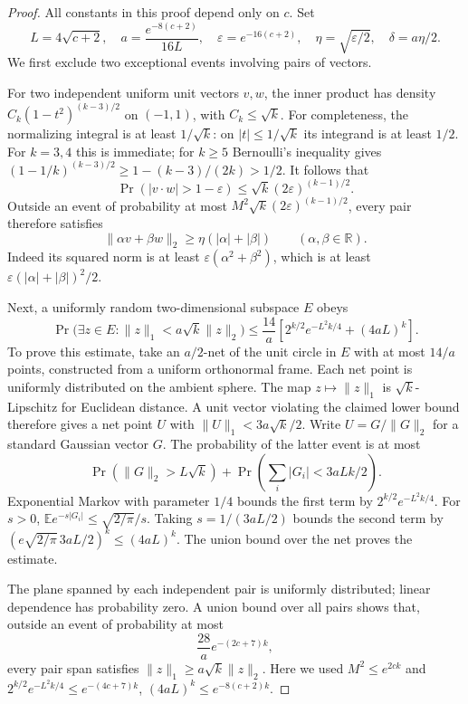 \documentclass[11pt]{article}
\begin{document}
\begin{proof}
All constants in this proof depend only on $c$. Set
\[
 L=4\sqrt{c+2},\quad a=\frac{e^{-8(c+2)}}{16L},\quad
 \varepsilon=e^{-16(c+2)},\quad
 \eta=\sqrt{\varepsilon/2},\quad \delta=a\eta/2.
\]
We first exclude two exceptional events involving pairs of vectors.

For two independent uniform unit vectors $v,w$, the inner product
has density $C_k(1-t^2)^{(k-3)/2}$ on $(-1,1)$, with $C_k\leq\sqrt{k}$.
For completeness, the normalizing integral is at least $1/\sqrt{k}$:
on $|t|\leq1/\sqrt{k}$ its integrand is at least $1/2$.
For $k=3,4$ this is immediate; for $k\geq5$ Bernoulli's inequality
gives $(1-1/k)^{(k-3)/2}\geq1-(k-3)/(2k)>1/2$.
It follows that
\[
 \Pr(|v\cdot w|>1-\varepsilon)
 \leq\sqrt{k}(2\varepsilon)^{(k-1)/2}.
\]
Outside an event of probability at most
$M^2\sqrt{k}(2\varepsilon)^{(k-1)/2}$, every pair therefore satisfies
\[
 \|\alpha v+\beta w\|_2
 \geq\eta(|\alpha|+|\beta|)
 \qquad(\alpha,\beta\in\mathbb R).
\]
Indeed its squared norm is at least
$\varepsilon(\alpha^2+\beta^2)$, which is at least
$\varepsilon(|\alpha|+|\beta|)^2/2$.

Next, a uniformly random two-dimensional subspace $E$ obeys
\[
 \Pr\bigl(\exists z\in E:\|z\|_1<a\sqrt{k}\|z\|_2\bigr)
 \leq \frac{14}{a}
 \left[2^{k/2}e^{-L^2k/4}+(4aL)^k\right].
\]
To prove this estimate, take an $a/2$-net of the unit circle in $E$
with at most $14/a$ points, constructed from a uniform orthonormal
frame. Each net point is uniformly distributed on the ambient sphere.
The map $z\mapsto\|z\|_1$ is $\sqrt{k}$-Lipschitz for Euclidean
distance. A unit vector violating the claimed lower bound therefore
gives a net point $U$ with $\|U\|_1<3a\sqrt{k}/2$.
Write $U=G/\|G\|_2$ for a standard Gaussian vector $G$.
The probability of the latter event is at most
\[
 \Pr(\|G\|_2>L\sqrt{k})+
 \Pr\left(\sum_i|G_i|<3aLk/2\right).
\]
Exponential Markov with parameter $1/4$ bounds the first term by
$2^{k/2}e^{-L^2k/4}$. For $s>0$,
$\mathbb E e^{-s|G_i|}\leq\sqrt{2/\pi}/s$.
Taking $s=1/(3aL/2)$ bounds the second term by
$(e\sqrt{2/\pi}\,3aL/2)^k\leq(4aL)^k$.
The union bound over the net proves the estimate.

The plane spanned by each independent pair is uniformly distributed;
linear dependence has probability zero. A union bound over all pairs
shows that, outside an event of probability at most
\[
 \frac{28}{a}e^{-(2c+7)k},
\]
every pair span satisfies $\|z\|_1\geq a\sqrt{k}\|z\|_2$.
Here we used $M^2\leq e^{2ck}$ and
$2^{k/2}e^{-L^2k/4}\leq e^{-(4c+7)k}$,
$(4aL)^k\leq e^{-8(c+2)k}$.


\end{proof}
\end{document}
